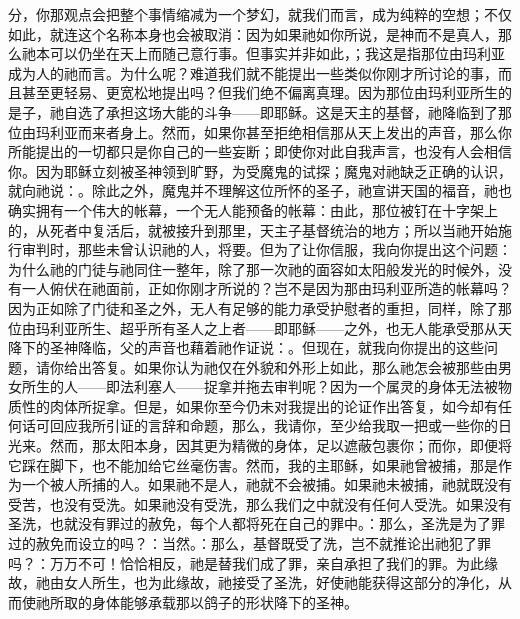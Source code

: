 分，你那观点会把整个事情缩减为一个梦幻，就我们而言，成为纯粹的空想；不仅如此，就连这个名称本身也会被取消：因为如果祂如你所说，是神而不是真人，那么祂本可以仍坐在天上而随己意行事。但事实并非如此，；我这是指那位由玛利亚成为人的祂而言。为什么呢？难道我们就不能提出一些类似你刚才所讨论的事，而且甚至更轻易、更宽松地提出吗？但我们绝不偏离真理。因为那位由玛利亚所生的是子，祂自选了承担这场大能的斗争——即耶稣。这是天主的基督，祂降临到了那位由玛利亚而来者身上。然而，如果你甚至拒绝相信那从天上发出的声音，那么你所能提出的一切都只是你自己的一些妄断；即使你对此自我声言，也没有人会相信你。因为耶稣立刻被圣神领到旷野，为受魔鬼的试探；魔鬼对祂缺乏正确的认识，就向祂说：。除此之外，魔鬼并不理解这位所怀的圣子，祂宣讲天国的福音，祂也确实拥有一个伟大的帐幕，一个无人能预备的帐幕：由此，那位被钉在十字架上的，从死者中复活后，就被接升到那里，天主子基督统治的地方；所以当祂开始施行审判时，那些未曾认识祂的人，将要。但为了让你信服，我向你提出这个问题：为什么祂的门徒与祂同住一整年，除了那一次祂的面容如太阳般发光的时候外，没有一人俯伏在祂面前，正如你刚才所说的？岂不是因为那由玛利亚所造的帐幕吗？因为正如除了门徒和圣之外，无人有足够的能力承受护慰者的重担，同样，除了那位由玛利亚所生、超乎所有圣人之上者——即耶稣——之外，也无人能承受那从天降下的圣神降临，父的声音也藉着祂作证说：。但现在，就我向你提出的这些问题，请你给出答复。如果你认为祂仅在外貌和外形上如此，那么祂怎会被那些由男女所生的人——即法利塞人——捉拿并拖去审判呢？因为一个属灵的身体无法被物质性的肉体所捉拿。但是，如果你至今仍未对我提出的论证作出答复，如今却有任何话可回应我所引证的言辞和命题，那么，我请你，至少给我取一把或一些你的日光来。然而，那太阳本身，因其更为精微的身体，足以遮蔽包裹你；而你，即便将它踩在脚下，也不能加给它丝毫伤害。然而，我的主耶稣，如果祂曾被捕，那是作为一个被人所捕的人。如果祂不是人，祂就不会被捕。如果祂未被捕，祂就既没有受苦，也没有受洗。如果祂没有受洗，那么我们之中就没有任何人受洗。如果没有圣洗，也就没有罪过的赦免，每个人都将死在自己的罪中。：那么，圣洗是为了罪过的赦免而设立的吗？：当然。：那么，基督既受了洗，岂不就推论出祂犯了罪吗？：万万不可！恰恰相反，祂是替我们成了罪，亲自承担了我们的罪。为此缘故，祂由女人所生，也为此缘故，祂接受了圣洗，好使祂能获得这部分的净化，从而使祂所取的身体能够承载那以鸽子的形状降下的圣神。\par

